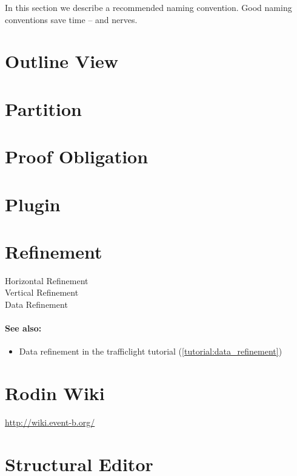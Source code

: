 In this section we describe a recommended naming convention.  Good naming conventions save time -- and nerves.

\section{Outline View}
\label{outline_view}

\section{Partition}
\label{partition}

\section{Proof Obligation}
\label{proof_obligation}

\section{Plugin}
\label{plugin}

\section{Refinement}
\label{refinement}

\begin{description}
	\item[Horizontal Refinement]
	\item[Vertical Refinement]
	\item[Data Refinement]
\end{description}

\paragraph*{See also:}
\begin{itemize}
\item Data refinement in the trafficlight tutorial (\ref{tutorial:data_refinement})
\end{itemize}

\section{Rodin Wiki}
\label{rodin_wiki}

\url{http://wiki.event-b.org/}

\section{Structural Editor}
\label{structural_editor}

